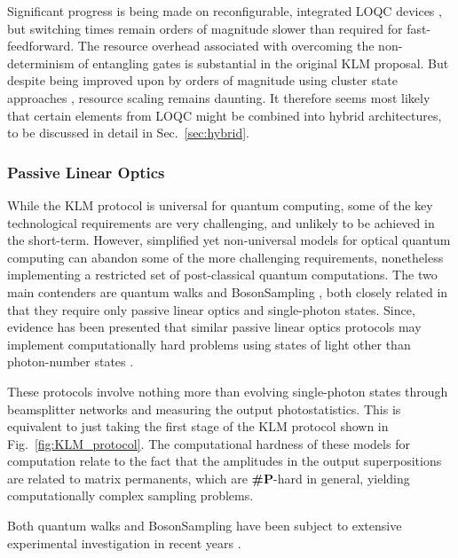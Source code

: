 \documentclass[aps,rmp,twocolumn,amsmath,amssymb,nofootinbib,superscriptaddress]{revtex4}
\begin{document}
Significant progress is being made on reconfigurable, integrated LOQC devices \cite{bib:UniversalLOOBrien}, but switching times remain orders of magnitude slower than required for fast-feedforward. The resource overhead associated with overcoming the non-determinism of entangling gates is substantial in the original KLM proposal. But despite being improved upon by orders of magnitude using cluster state approaches \cite{bib:Nielsen04, bib:BrowneRudolph05}, resource scaling remains daunting. It therefore seems most likely that certain elements from LOQC might be combined into hybrid architectures, to be discussed in detail in Sec.~\ref{sec:hybrid}.

%
%

\subsubsection{Passive Linear Optics} \label{sec:BS}

While the KLM protocol is universal for quantum computing, some of the key technological requirements are very challenging, and unlikely to be achieved in the short-term. However, simplified yet non-universal models for optical quantum computing can abandon some of the more challenging requirements, nonetheless implementing a restricted set of post-classical quantum computations. The two main contenders are quantum walks \cite{bib:Aharonov93, bib:Aharonov01, bib:Kempe03, bib:Salvador12} and {\sc BosonSampling} \cite{bib:AaronsonArkhipov10, bib:RohdeIntroBS15}, both closely related in that they require only passive linear optics and single-photon states. Since, evidence has been presented that similar passive linear optics protocols may implement computationally hard problems using states of light other than photon-number states \cite{bib:RandBS, bib:RohdePhotAdd15, bib:RohdeDisp15, bib:RohdeCat15, ???}.

These protocols involve nothing more than evolving single-photon states through beamsplitter networks and measuring the output photostatistics. This is equivalent to just taking the first stage of the KLM protocol shown in Fig.~\ref{fig:KLM_protocol}. The computational hardness of these models for computation relate to the fact that the amplitudes in the output superpositions are related to matrix permanents, which are \textbf{\#P}-hard in general, yielding computationally complex sampling problems.

Both quantum walks and {\sc BosonSampling} have been subject to extensive experimental investigation in recent years \cite{bib:PeruzzoQW, bib:Broome10, bib:Schreiber11b, bib:Owens11, bib:RohdeQWExp12, bib:Broome2012, bib:RohdeQWExp12, bib:Spring2, bib:Crespi3, bib:Tillmann4, ???}.
\end{document}
